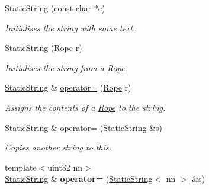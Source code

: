 \begin{DoxyCompactItemize}
\item 
\hyperlink{classetk_1_1_static_string_a981a44c389ceafb80a62fe4fe395e126}{Static\-String} (const char $\ast$c)
\begin{DoxyCompactList}\small\item\em Initialises the string with some text. \end{DoxyCompactList}\item 
\hypertarget{classetk_1_1_static_string_a0e35289bf9413c495bc99d369b37840a}{\hyperlink{classetk_1_1_static_string_a0e35289bf9413c495bc99d369b37840a}{Static\-String} (\hyperlink{classetk_1_1_rope}{Rope} r)}\label{classetk_1_1_static_string_a0e35289bf9413c495bc99d369b37840a}

\begin{DoxyCompactList}\small\item\em Initialises the string from a \hyperlink{classetk_1_1_rope}{Rope}. \end{DoxyCompactList}\item 
\hypertarget{classetk_1_1_static_string_ab77524b899b77838dc7b88fe31506bf9}{\hyperlink{classetk_1_1_static_string}{Static\-String} \& \hyperlink{classetk_1_1_static_string_ab77524b899b77838dc7b88fe31506bf9}{operator=} (\hyperlink{classetk_1_1_rope}{Rope} r)}\label{classetk_1_1_static_string_ab77524b899b77838dc7b88fe31506bf9}

\begin{DoxyCompactList}\small\item\em Assigns the contents of a \hyperlink{classetk_1_1_rope}{Rope} to the string. \end{DoxyCompactList}\item 
\hypertarget{classetk_1_1_static_string_a93930b4532feb2646fdf766bbf4af446}{\hyperlink{classetk_1_1_static_string}{Static\-String} \& \hyperlink{classetk_1_1_static_string_a93930b4532feb2646fdf766bbf4af446}{operator=} (\hyperlink{classetk_1_1_static_string}{Static\-String} \&s)}\label{classetk_1_1_static_string_a93930b4532feb2646fdf766bbf4af446}

\begin{DoxyCompactList}\small\item\em Copies another string to this. \end{DoxyCompactList}\item 
\hypertarget{classetk_1_1_static_string_abd07ea1a80fac1e4d13ffe91e8ce2218}{{\footnotesize template$<$uint32 nn$>$ }\\\hyperlink{classetk_1_1_static_string}{Static\-String} \& {\bfseries operator=} (\hyperlink{classetk_1_1_static_string}{Static\-String}$<$ nn $>$ \&s)}\label{classetk_1_1_static_string_abd07ea1a80fac1e4d13ffe91e8ce2218}


\end{DoxyCompactItemize}
